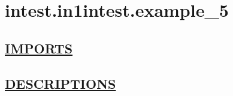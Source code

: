 \chapter*{intest.in1intest.example\_5}
\hypertarget{ecldoc:toc:intest.in1intest.example_5}{}

\section*{\underline{IMPORTS}}

\section*{\underline{DESCRIPTIONS}}
